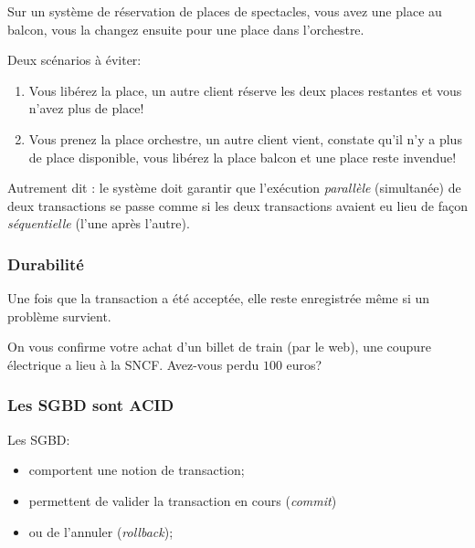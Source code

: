 \begin{exemple}
   Sur un système de réservation de places de spectacles, vous
avez une place au balcon, vous la changez ensuite pour une place dans
l'orchestre.

Deux scénarios à éviter:
\begin{enumerate}
\item Vous libérez la place, un autre client réserve les deux places
  restantes et vous n'avez plus de place!
\item Vous prenez la place orchestre, un autre client vient, constate
  qu'il n'y a plus de place disponible, vous libérez la place balcon
  et une place reste invendue!
\end{enumerate}
\end{exemple}


Autrement dit : le système doit garantir que l'exécution
\emph{parallèle} (simultanée) de
deux transactions se passe comme si les deux transactions avaient eu
lieu de façon \emph{séquentielle} (l'une après l'autre).

\subsubsection{Durabilité}

\begin{defi}[Durabilité]
  Une fois que la transaction a été acceptée, elle reste enregistrée
même si un problème survient.
\end{defi}

\begin{exemple}
  On vous confirme votre achat d'un billet de train (par le
web), une coupure électrique a lieu à la SNCF. Avez-vous perdu $100$
euros?
\end{exemple}

\subsubsection{Les SGBD sont ACID}

Les SGBD:
\begin{itemize}
\item comportent une notion de transaction;
\item permettent de valider la transaction en cours (\textit{commit})
\item ou de l'annuler (\textit{rollback});
\end{itemize}

